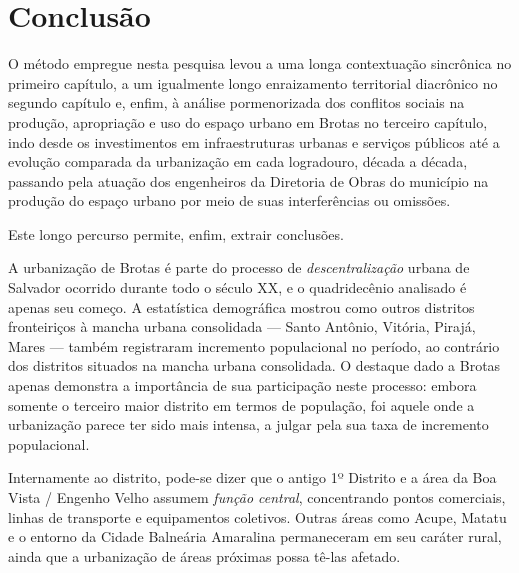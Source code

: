 \chapter*[Conclusão]{Conclusão}\label{concl}


O método empregue nesta pesquisa levou a uma longa contextuação sincrônica no primeiro capítulo, a um igualmente longo enraizamento territorial diacrônico no segundo capítulo e, enfim, à análise pormenorizada dos conflitos sociais na produção, apropriação e uso do espaço urbano em Brotas no terceiro capítulo, indo desde os investimentos em infraestruturas urbanas e serviços públicos até a evolução comparada da urbanização em cada logradouro, década a década, passando pela atuação dos engenheiros da Diretoria de Obras do município na produção do espaço urbano por meio de suas interferências ou omissões.

Este longo percurso permite, enfim, extrair conclusões. 

A urbanização de Brotas é parte do processo de \textit{descentralização} urbana de Salvador ocorrido durante todo o século XX, e o quadridecênio analisado é apenas seu começo. A estatística demográfica mostrou como outros distritos fronteiriços à mancha urbana consolidada --- Santo Antônio, Vitória, Pirajá, Mares --- também registraram incremento populacional no período, ao contrário dos distritos situados na mancha urbana consolidada. O destaque dado a Brotas apenas demonstra a importância de sua participação neste processo: embora somente o terceiro maior distrito em termos de população, foi aquele onde a urbanização parece ter sido mais intensa, a julgar pela sua taxa de incremento populacional.

Internamente ao distrito, pode-se dizer que o antigo 1º Distrito e a área da Boa Vista / Engenho Velho assumem \textit{função central}, concentrando pontos comerciais, linhas de transporte e equipamentos coletivos. Outras áreas como Acupe, Matatu e o entorno da Cidade Balneária Amaralina permaneceram em seu caráter rural, ainda que a urbanização de áreas próximas possa tê-las afetado. 

